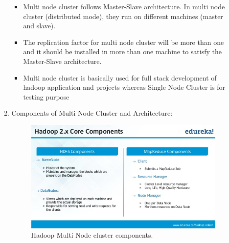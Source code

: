 \documentclass[a4paper,10pt]{article}
\begin{document}
\begin{enumerate}
\begin{enumerate}
\begin{itemize}
		\item Multi node cluster follows Master-Slave architecture. In multi node cluster (distributed mode), they run on different machines (master and slave).
		\item The replication factor for multi node cluster will be more than one and it should be installed in more than one machine to satisfy the Master-Slave architecture.
		\item Multi node cluster is basically used for full stack development of hadoop application and projects whereas Single Node Cluster is for testing purpose
	\end{itemize}
	\pagebreak
	\item Components of Multi Node Cluster and Architecture: 
	 \begin{figure}[h]
	 	\includegraphics[scale=0.45,center]{exptFourScreenShot/HadoopMultiNodeComponents.jpg}
	 	\caption{Hadoop Multi Node cluster components.}
	 	\label{fig:0.0.1}
	 \end{figure}


\end{enumerate}
\end{enumerate}
\end{document}
